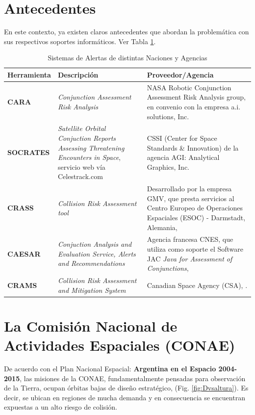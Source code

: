 \section{Antecedentes}
En este contexto, ya existen claros antecedentes que abordan la problem\'atica con sus respectivos soportes inform\'aticos. Ver Tabla \ref{tab:sisal}.
\begin{table}[!h]
\caption[Sistemas de Alerta]{Sistemas de Alertas de distintas Naciones y Agencias}
\begin{tabular}{lp{5cm}p{6cm}}
\hline
Herramienta & Descripci\'on & Proveedor/Agencia\\
\hline
{\bf{CARA}} & {\it{Conjunction Assessment Risk Analysis}} & NASA Robotic Conjunction Assessment Risk Analysis group, en convenio con la empresa a.i. solutions, Inc.\\
\hline
{\bf{SOCRATES}} & {\it{Satellite Orbital Conjuction Reports Assessing Threatening Encounters in Space}}, servicio web v\'ia Celestrack.com & CSSI (Center for Space Standards \& Innovation) de la agencia AGI: Analytical Graphics, Inc.\\
\hline
{\bf{CRASS}} & {\it{Collision Risk Assessment tool}} & Desarrollado por la
empresa GMV, que presta servicios al Centro Europeo de Operaciones
Espaciales (ESOC) - Darmstadt, Alemania, \citep{alarconRodriguez}\\
\hline
{\bf{CAESAR}} & {\it{Conjuction Analysis and Evaluation Service, Alerts and Recommendations}} & Agencia francesa CNES, que utiliza como soporte el Software JAC {\it{Java for Assessment of Conjunctions}}, \citep{laporte}\\
\hline
{\bf{CRAMS}} & {\it{Collision Risk Assessment and Mitigation System}} & Canadian Space Agency (CSA), \citep{babiker}.\\
\hline
\end{tabular}
\label{tab:sisal}
\end{table}

\section{La Comisi\'on Nacional de Actividades Espaciales (CONAE)}
De acuerdo con el Plan Nacional Espacial: {\bf{ Argentina en el Espacio 2004-2015}}, las misiones de la CONAE, fundamentalmente pensadas para observaci\'on de la Tierra, ocupan \'orbitas bajas de dise\~no estrat\'egico, (Fig. \ref{fig:Dvsaltura}). Es decir, se ubican en regiones de mucha demanda y en consecuencia se encuentran expuestas a un alto riesgo de colisi\'on.\\

